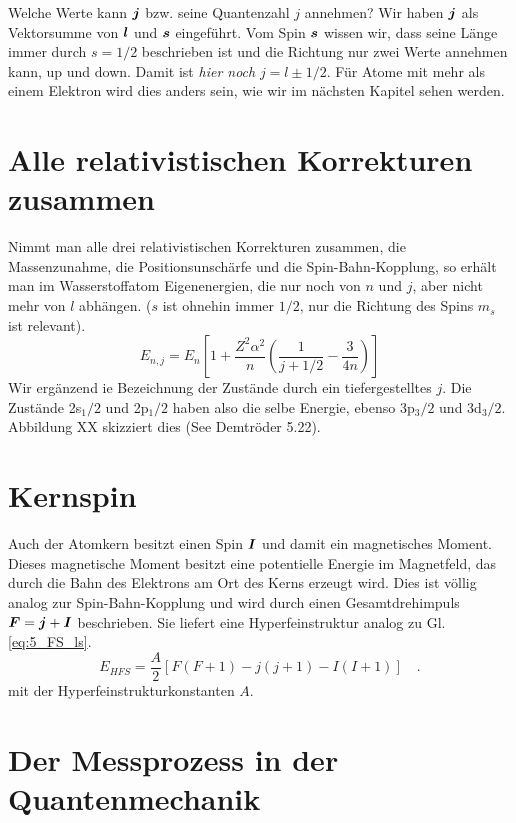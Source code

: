 Welche Werte kann $\boldsymbol{j}$ bzw. seine Quantenzahl $j$ annehmen? Wir haben $\boldsymbol{j}$ als Vektorsumme von $\boldsymbol{l}$ und $\boldsymbol{s}$ eingeführt. Vom Spin $\boldsymbol{s}$ wissen wir, dass seine Länge immer durch $s=1/2$ beschrieben ist und die Richtung nur zwei Werte annehmen kann, up und down. Damit ist \emph{hier noch} $j = l \pm 1/2$. Für Atome mit mehr als einem Elektron wird dies anders sein, wie wir im nächsten Kapitel sehen werden.


\section{Alle relativistischen Korrekturen zusammen}

Nimmt man alle drei relativistischen Korrekturen zusammen, die Massenzunahme, die Positionsunschärfe und die Spin-Bahn-Kopplung, so erhält man im Wasserstoffatom Eigenenergien, die nur noch von $n$ und $j$, aber nicht mehr von $l$ abhängen. ($s$ ist ohnehin immer $1/2$, nur die Richtung des Spins $m_s$ ist relevant).
\begin{equation}
    E_{n,j} = E_n \left[ 1 + \frac{Z^2 \alpha^2}{n} \left( \frac{1}{j + 1/2} - \frac{3}{4n} \right) \right]
\end{equation}
Wir ergänzend ie Bezeichnung der   Zustände durch ein tiefergestelltes $j$. Die Zustände 2s$_1/2$ und 2p$_1/2$ haben also die selbe Energie, ebenso  3p$_3/2$ und 3d$_3/2$. Abbildung XX skizziert dies (See Demtröder 5.22).





\section{Kernspin}

Auch der Atomkern besitzt einen Spin $\boldsymbol{I}$ und damit ein magnetisches Moment. Dieses magnetische Moment besitzt eine potentielle Energie im Magnetfeld, das durch die Bahn des Elektrons am Ort des Kerns erzeugt wird. Dies ist völlig analog zur Spin-Bahn-Kopplung und wird durch einen Gesamtdrehimpuls $\boldsymbol{F} = \boldsymbol{j} + \boldsymbol{I}$ beschrieben. Sie liefert eine Hyperfeinstruktur analog zu Gl. \ref{eq:5_FS_ls}.
\begin{equation}
    E_{HFS}     = \frac{A}{2}  \left[ F(F+1) - j(j+1) - I(I+1) \right] \quad . 
\end{equation}
mit der Hyperfeinstrukturkonstanten $A$.


\section{Der Messprozess in der Quantenmechanik}

